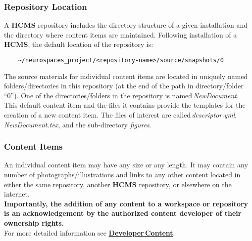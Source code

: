\documentclass[12pt]{article}
\begin{document}
\subsubsection*{Repository Location}

A {\bf \small HCMS} repository includes the directory structure of a given installation and the directory where content items are maintained. Following installation of a {\bf \small HCMS}, the default location of the repository is:

\begin{verbatim}
    ~/neurospaces_project/<repository-name>/source/snapshots/0
\end{verbatim}
The source materials for individual content items are located in uniquely named folders/directories in this repository (at the end of the path in directory/folder ``0''). One of the directories/folders in the repository is named\,{\it NewDocument}. This default content item and the files it contains provide the templates for the creation of a new content item. The files of interest are called\,{\it descriptor.yml}, {\it NewDocument.tex}, and the sub-directory {\it figures}.

\subsubsection*{Content Items}

An individual content item may have any size or any length. It may contain any number of photographs/illustrations and links to any other content located in either the same repository, another {\bf \small HCMS} repository, or elsewhere on the internet.\\
{\bf Importantly, the addition of any content to a workspace or repository is an acknowledgement by the authorized content developer of their ownership rights.}\\
For more detailed information see \href{../developer-content/developer-content.tex}{\bf Developer\,Content}.

%
%
\end{document}
